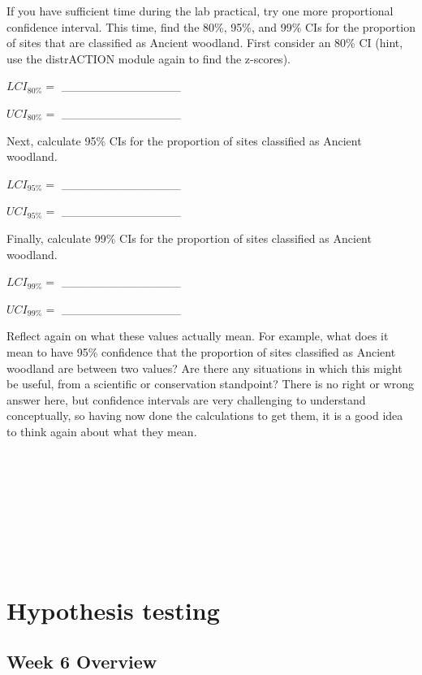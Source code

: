 \documentclass[
]{scrbook}
\begin{document}
If you have sufficient time during the lab practical, try one more proportional confidence interval.
This time, find the 80\%, 95\%, and 99\% CIs for the proportion of sites that are classified as Ancient woodland.
First consider an 80\% CI (hint, use the distrACTION module again to find the z-scores).

\(LCI_{80\%} =\) \_\_\_\_\_\_\_\_\_\_\_\_\_\_

\(UCI_{80\%} =\) \_\_\_\_\_\_\_\_\_\_\_\_\_\_

Next, calculate 95\% CIs for the proportion of sites classified as Ancient woodland.

\(LCI_{95\%} =\) \_\_\_\_\_\_\_\_\_\_\_\_\_\_

\(UCI_{95\%} =\) \_\_\_\_\_\_\_\_\_\_\_\_\_\_

Finally, calculate 99\% CIs for the proportion of sites classified as Ancient woodland.

\(LCI_{99\%} =\) \_\_\_\_\_\_\_\_\_\_\_\_\_\_

\(UCI_{99\%} =\) \_\_\_\_\_\_\_\_\_\_\_\_\_\_

Reflect again on what these values actually mean.
For example, what does it mean to have 95\% confidence that the proportion of sites classified as Ancient woodland are between two values?
Are there any situations in which this might be useful, from a scientific or conservation standpoint?
There is no right or wrong answer here, but confidence intervals are very challenging to understand conceptually, so having now done the calculations to get them, it is a good idea to think again about what they mean.

\begin{verbatim}








\end{verbatim}

\hypertarget{part-hypothesis-testing}{%
\part{Hypothesis testing}\label{part-hypothesis-testing}}

\hypertarget{Week6}{%
\chapter*{Week 6 Overview}\label{Week6}}
\end{document}
